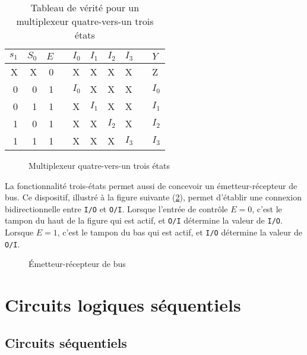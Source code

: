 \documentclass[letter, oneside]{book}
\begin{document}
\begin{table}[htbp]
\caption{\label{tab:org2847469}Tableau de vérité pour un  multiplexeur quatre-vers-un trois états}
\centering
\begin{tabular}{rrrlllllll}
\(s_1\) & \(S_0\) & \(E\) &  & \(I_0\) & \(I_1\) & \(I_2\) & \(I_3\) &  & \(Y\)\\[0pt]
\hline
X & X & 0 &  & X & X & X & X &  & Z\\[0pt]
0 & 0 & 1 &  & \(I_0\) & X & X & X &  & \(I_0\)\\[0pt]
0 & 1 & 1 &  & X & \(I_1\) & X & X &  & \(I_1\)\\[0pt]
1 & 0 & 1 &  & X & X & \(I_2\) & X &  & \(I_2\)\\[0pt]
1 & 1 & 1 &  & X & X & X & \(I_3\) &  & \(I_3\)\\[0pt]
\end{tabular}
\end{table}


\begin{figure}[htbp]
\centering

\caption{\label{fig:org30ef9ad}Multiplexeur quatre-vers-un trois états}
\end{figure}

La fonctionnalité trois-états permet aussi de concevoir un
émetteur-récepteur de bus. Ce dispositif, illustré à la figure
suivante (\ref{fig:org15ece8b}), permet d'établir une connexion
bidirectionnelle entre \texttt{I/O} et \texttt{O/I}. Lorsque l'entrée de contrôle
\(E = 0\), c'est le tampon du haut de la figure qui est actif, et
\texttt{O/I} détermine la valeur de \texttt{I/O}. Lorsque \(E = 1\), c'est le tampon
du bas qui est actif, et \texttt{I/O} détermine la valeur de \texttt{O/I}.

\begin{figure}[htbp]
\centering

\caption{\label{fig:org15ece8b}Émetteur-récepteur de bus}
\end{figure}


\part{Circuits logiques séquentiels}
\label{sec:org3433c65}
\chapter{Circuits séquentiels}
\label{sec:org5d91284}
\end{document}
